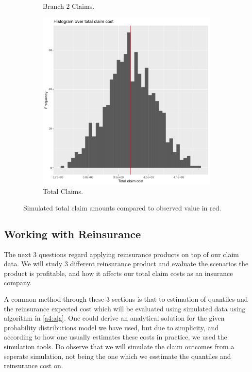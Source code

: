 \documentclass[11pt]{article}
\begin{document}
\begin{figure}[!h]
\begin{subfigure}{.33\textwidth}
      \caption{Branch 2 Claims.}
    \end{subfigure}
    \begin{subfigure}{.33\textwidth}
      \centering
      \includegraphics[width=.9\linewidth]{plots/simulation/histogram_total_claim_cost.png}
      \caption{Total Claims.}
    \end{subfigure}%
    \caption{Simulated total claim amounts compared to observed value in red.}
    \label{a4:claim_cost2}
\end{figure}

\subsection*{Working with Reinsurance}
The next 3 questions regard applying reinsurance products on top of our claim data.
We will study 3 different reinsurance product and evaluate the scenarios the product is profitable, and how it affects our total claim costs as an insurance company.

A common method through these 3 sections is that to estimation of quantiles and the reinsurance expected cost which will be evaluated using  simulated data using algorithm in \ref{a4:alg}.
One could derive an analytical solution for the given probability distributions model we have used, but due to simplicity, and according to how one usually estimates these costs in practice, we used the simulation tools.
Do observe that we will simulate the claim outcomes from a seperate simulation, not being the one which we esstimate the quantiles and reinsurance cost on.
\end{document}
